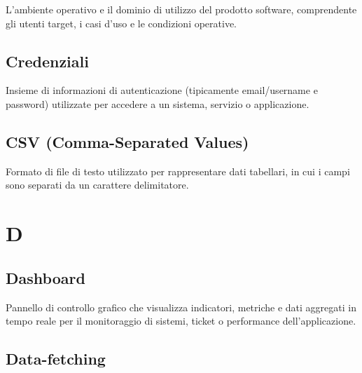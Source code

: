 \documentclass[a4paper, 11pt, oneside]{scrartcl} %
\begin{document}
L'ambiente operativo e il dominio di utilizzo del prodotto software, comprendente gli utenti target, i casi d'uso e le condizioni operative.

\vspace{0.5cm}

\subsection*{Credenziali}


Insieme di informazioni di autenticazione (tipicamente email/username e password) utilizzate per accedere a un sistema, servizio o applicazione.

\vspace{0.5cm}

\subsection*{CSV (Comma-Separated Values)}
Formato di file di testo utilizzato per rappresentare dati tabellari, in cui i campi sono separati da un carattere delimitatore.
\vspace{0.5cm}



\section*{D}


\subsection*{Dashboard}


Pannello di controllo grafico che visualizza indicatori, metriche e dati aggregati in tempo reale per il monitoraggio di sistemi, ticket o performance dell'applicazione.

\vspace{0.5cm}

\subsection*{Data-fetching}

\end{document}
